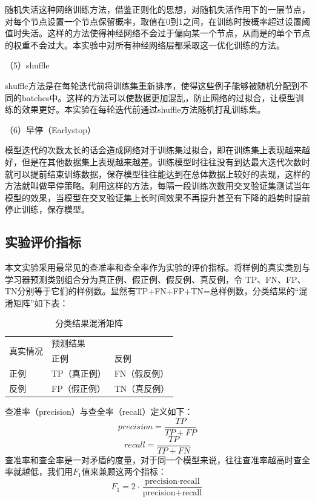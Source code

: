 \documentclass[winfonts,master,oneside,nobackinfo]{njuthesis}
\begin{document}
随机失活这种网络训练方法，借鉴正则化的思想，对随机失活作用下的一层节点，对每个节点设置一个节点保留概率，取值在0到1之间，在训练时按概率超过设置阈值时失活。这样的方法使得神经网络不会过于偏向某一个节点，从而是的单个节点的权重不会过大。本实验中对所有神经网络层都采取这一优化训练的方法。

（5）shuffle

shuffle方法是在每轮迭代前将训练集重新排序，使得这些例子能够被随机分配到不同的batches中。这样的方法可以使数据更加混乱，防止网络的过拟合，让模型训练的效果更好。本实验在每轮迭代前通过shuffle方法随机打乱训练集。

（6）早停（Earlystop）

模型迭代的次数太长的话会造成网络对于训练集过拟合，即在训练集上表现越来越好，但是在其他数据集上表现越来越差。训练模型时往往没有到达最大迭代次数时就可以提前结束训练数据，保存模型往往能达到在总体数据上较好的表现，这样的方法就叫做早停策略。利用这样的方法，每隔一段训练次数用交叉验证集测试当年模型的效果，当模型在交叉验证集上长时间效果不再提升甚至有下降的趋势时提前停止训练，保存模型。

\subsection{实验评价指标}

本文实验采用最常见的查准率和查全率作为实验的评价指标。将样例的真实类别与学习器预测类别组合分为真正例、假正例、假反例、真反例，令
TP、FN、FP、TN分别等于它们的样例数。显然有TP+FN+FP+TN=总样例数，分类结果的“混淆矩阵”如下表：

\begin{table}[H]
\centering
\begin{tabular}{|l|l|l|}
\hline
\multirow{2}{*}{真实情况} & \multicolumn{2}{l|}{预测结果} \\ \cline{2-3} 
                      & 正例          & 反例          \\ \hline
正例                    & TP（真正例）     & FN（假反例）     \\ \hline
反例                    & FP（假正例）     & TN（真反例）     \\ \hline
\end{tabular}
\caption{分类结果混淆矩阵}
\end{table}


查准率（precision）与查全率（recall）定义如下：
\begin{equation}
precision =\frac{T P}{T P+F P}
\end{equation}
\begin{equation}
recall=\frac{T P}{T P+F N}
\end{equation}
查准率和查全率是一对矛盾的度量，对于同一个模型来说，往往查准率越高时查全率就越低，我们用$F_{1}$值来兼顾这两个指标：
\begin{equation}
F_{1}=2 \cdot \frac{\text {precision} \cdot \text {recall}}{\text {precision}+\text {recall}}
\end{equation}
\end{document}
